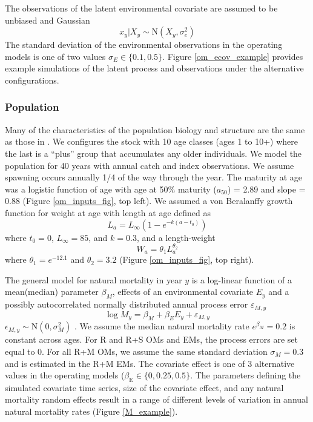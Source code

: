 \documentclass[
  12pt,
]{article}
\begin{document}
The observations of the latent environmental covariate are assumed to be unbiased and Gaussian
\[
x_y|X_y \sim \text{N}\left(X_y,\sigma^2_e\right)
\]
The standard deviation of the environmental observations in the operating models is one of two values \(\sigma_E \in \{0.1, 0.5\}\). Figure \ref{om_ecov_example} provides example simulations of the latent process and observations under the alternative configurations.

\hypertarget{population}{%
\subsubsection*{Population}\label{population}}

Many of the characteristics of the population biology and structure are the same as those in \citet{milleretal_inreview1}. We configures the stock with 10 age classes (ages 1 to 10+) where the last is a ``plus'' group that accumulates any older individuals. We model the population for 40 years with annual catch and index observations. We assume spawning occurs annually 1/4 of the way through the year. The maturity at age was a logistic function of age with age at 50\% maturity (\(a_{50}\)) = 2.89 and slope = 0.88 (Figure \ref{om_inputs_fig}, top left). We assumed a von Beralanffy growth function for weight at age with length at age defined as
\[
L_a = L_{\infty}\left(1 - e^{-k(a - t_0)}\right)
\]
where \(t_0 = 0\), \(L_\infty = 85\), and \(k = 0.3\), and a length-weight
\[
W_a = \theta_1 L_a^{\theta_2}
\]
where \(\theta_1 = e^{-12.1}\) and \(\theta_2 = 3.2\) (Figure \ref{om_inputs_fig}, top right).

The general model for natural mortality in year \(y\) is a log-linear function of a mean(median) parameter \(\beta_{M}\), effects of an environmental covariate \(E_y\) and a possibly autocorrelated normally distributed annual process error \(\varepsilon_{M,y}\)
\[
\log M_y = \beta_M + \beta_{E} E_y + \varepsilon_{M,y}
\]
\(\epsilon_{M,y} \sim \text{N}\left(0,\sigma_M^2\right)\) \citep{stockmiller21}. We assume the median natural mortality rate \(e^{\beta_M} = 0.2\) is constant across ages. For R and R+S OMs and EMs, the process errors are set equal to 0. For all R+M OMs, we assume the same standard deviation \(\sigma_M = 0.3\) and is estimated in the R+M EMs. The covariate effect is one of 3 alternative values in the operating models (\(\beta_\text{E} \in \{0,0.25,0.5\}\). The parameters defining the simulated covariate time series, size of the covariate effect, and any natural mortality random effects result in a range of different levels of variation in annual natural mortality rates (Figure \ref{M_example}).
\end{document}
